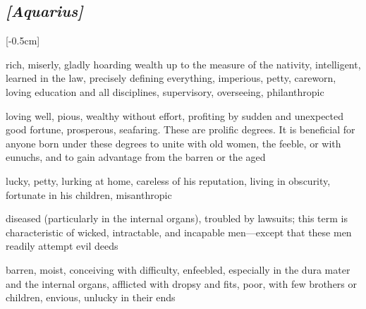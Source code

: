 \subsection{\textit{[Aquarius]}}
\marginnote{\Aquarius}[-0.5cm]
\vspace{-1mm}
\begin{description}[labelindent=0em , labelwidth=1em, labelsep=1em, leftmargin =!]
\item[\Mercury]
	[0-6] rich, miserly, gladly hoarding wealth up to the measure of the nativity, intelligent, learned in the law, precisely defining everything, imperious, petty, careworn,
loving education and all disciplines, supervisory, overseeing, philanthropic
\item[\Venus]
	[7-12] loving well, pious, wealthy without effort, profiting by sudden and unexpected good fortune, prosperous,
seafaring. These are prolific degrees. It is beneficial for anyone born under these degrees to unite with old women, the feeble, or with eunuchs, and to gain advantage from the barren or the aged
\item[\Jupiter]
	[13-19] lucky, petty, lurking at home, careless of his reputation, living in obscurity, fortunate in his children, misanthropic
\item[\Mars]
	[20-24] diseased (particularly in the internal organs), troubled
by lawsuits; this term is characteristic of wicked, intractable, and incapable men—except that these men readily attempt evil deeds	
\item[\Saturn]
	[25-29] barren, moist, conceiving with
difficulty, enfeebled, especially in the dura mater and the internal organs, afflicted with dropsy and fits, poor, with few brothers or children, envious, unlucky in their ends
\end{description}

